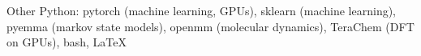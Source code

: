 
\begin{rubric}{Other}
\noentry{}
	Python: pytorch (machine learning, GPUs), sklearn (machine learning), pyemma (markov state models), openmm (molecular dynamics), TeraChem (DFT on GPUs), bash, \LaTeX
\end{rubric}

